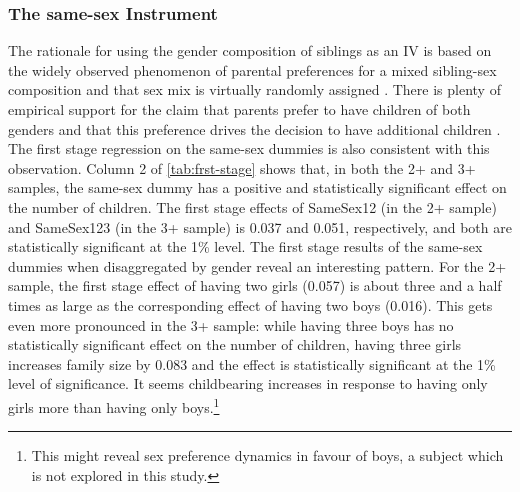 \subsubsection{The same-sex Instrument}
\label{section:samesx}

The rationale for using the gender composition of siblings as an IV is based on the widely observed phenomenon of parental preferences for a mixed sibling-sex composition and that sex mix is virtually randomly assigned \parencite{angrist_children_1998}. There is plenty of empirical support for the claim that parents prefer to have children of both genders and that this preference drives the decision to have additional children \parencite[e.g.,][]{norling_measuring_2018,bisbee_local_2015}. The first stage regression on the same-sex dummies is also consistent with this observation. Column 2 of \autoref{tab:frst-stage} shows that, in both the 2+ and 3+ samples, the same-sex dummy has a positive and statistically significant effect on the number of children.  The first stage effects of SameSex12 (in the 2+ sample) and SameSex123 (in the 3+ sample) is 0.037 and 0.051, respectively, and both are statistically significant at the 1\% level. The first stage results of the same-sex dummies when disaggregated by gender reveal an interesting pattern. For the 2+ sample, the first stage effect of having two girls (0.057) is about three and a half times as large as the corresponding effect of having two boys (0.016). This gets even more pronounced in the 3+ sample: while having three boys has no statistically significant effect on the number of children, having three girls increases family size by 0.083 and the effect is statistically significant at the 1\% level of significance. It seems childbearing increases in response to having only girls more than having only boys.\footnote{ This might reveal sex preference dynamics in favour of boys, a subject which is not explored in this study. } 

